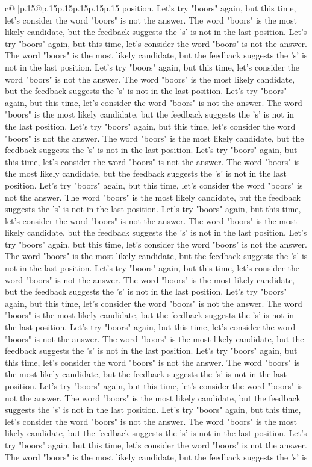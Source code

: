 \documentclass{article}
\begin{document}
{\begin{supertabular}{c@{$\;$}|p{.15\linewidth}@{}p{.15\linewidth}p{.15\linewidth}p{.15\linewidth}p{.15\linewidth}p{.15\linewidth}}
{{{position. Let's try "boors" again, but this time, let's consider the word "boors" is not the answer. The word "boors" is the most likely candidate, but the feedback suggests the 's' is not in the last position. Let's try "boors" again, but this time, let's consider the word "boors" is not the answer. The word "boors" is the most likely candidate, but the feedback suggests the 's' is not in the last position. Let's try "boors" again, but this time, let's consider the word "boors" is not the answer. The word "boors" is the most likely candidate, but the feedback suggests the 's' is not in the last position. Let's try "boors" again, but this time, let's consider the word "boors" is not the answer. The word "boors" is the most likely candidate, but the feedback suggests the 's' is not in the last position. Let's try "boors" again, but this time, let's consider the word "boors" is not the answer. The word "boors" is the most likely candidate, but the feedback suggests the 's' is not in the last position. Let's try "boors" again, but this time, let's consider the word "boors" is not the answer. The word "boors" is the most likely candidate, but the feedback suggests the 's' is not in the last position. Let's try "boors" again, but this time, let's consider the word "boors" is not the answer. The word "boors" is the most likely candidate, but the feedback suggests the 's' is not in the last position. Let's try "boors" again, but this time, let's consider the word "boors" is not the answer. The word "boors" is the most likely candidate, but the feedback suggests the 's' is not in the last position. Let's try "boors" again, but this time, let's consider the word "boors" is not the answer. The word "boors" is the most likely candidate, but the feedback suggests the 's' is not in the last position. Let's try "boors" again, but this time, let's consider the word "boors" is not the answer. The word "boors" is the most likely candidate, but the feedback suggests the 's' is not in the last position. Let's try "boors" again, but this time, let's consider the word "boors" is not the answer. The word "boors" is the most likely candidate, but the feedback suggests the 's' is not in the last position. Let's try "boors" again, but this time, let's consider the word "boors" is not the answer. The word "boors" is the most likely candidate, but the feedback suggests the 's' is not in the last position. Let's try "boors" again, but this time, let's consider the word "boors" is not the answer. The word "boors" is the most likely candidate, but the feedback suggests the 's' is not in the last position. Let's try "boors" again, but this time, let's consider the word "boors" is not the answer. The word "boors" is the most likely candidate, but the feedback suggests the 's' is not in the last position. Let's try "boors" again, but this time, let's consider the word "boors" is not the answer. The word "boors" is the most likely candidate, but the feedback suggests the 's' is not in the last position. Let's try "boors" again, but this time, let's consider the word "boors" is not the answer. The word "boors" is the most likely candidate, but the feedback suggests the 's' is }}}
\end{supertabular}}
\end{document}
